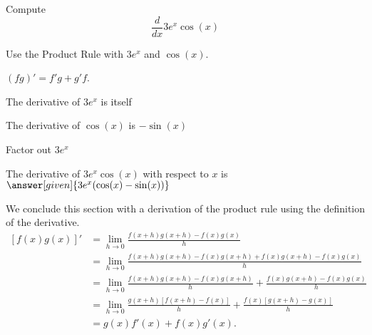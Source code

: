 \documentclass{ximera}
\begin{document}
\begin{problem} %
  Compute
  \[
  \frac{d}{dx} 3e^x \cos(x)
  \]
  
    \begin{hint}
      Use the Product Rule with $3e^x$ and $\cos(x)$.
    \end{hint}
    \begin{hint}
      $(fg)' = f'g+g'f$.
    \end{hint}
    \begin{hint}
      The derivative of $3e^x$ is itself
    \end{hint}
    \begin{hint}
      The derivative of $\cos(x)$ is $-\sin(x)$
    \end{hint}
		\begin{hint}
      Factor out $3e^x$
    \end{hint}
		The derivative of $3e^x\cos(x)$ with respect to $x$ is
		 $\answer[given]{3e^x(\cos(x) - \sin(x))}$
		
\end{problem}




\begin{center}
\begin{foldable}
\end{foldable}
\end{center}

We conclude this section with a derivation of the product rule using the definition of the derivative.
\begin{align*}
\left[f(x)g(x)\right]' &= \lim_{h \to 0} \frac{f(x+h)g(x+h)-f(x)g(x)}{h}\\[5pt] 
&= \lim_{h \to 0} \frac{f(x+h)g(x+h)- f(x)g(x+h) + f(x)g(x+h) - f(x)g(x)}{h}\\[5pt] 
&= \lim_{h \to 0} \frac{f(x+h)g(x+h)- f(x)g(x+h)}{h} + \frac{f(x)g(x+h) - f(x)g(x)}{h} \\[5pt] 
&=  \lim_{h \to 0} \frac{g(x+h)\left[f(x+h)- f(x)\right]}{h} + \frac{f(x)\left[g(x+h) - g(x)\right]}{h}\\[5pt] 
&= g(x)f'(x) + f(x)g'(x).
\end{align*}
\end{document}
